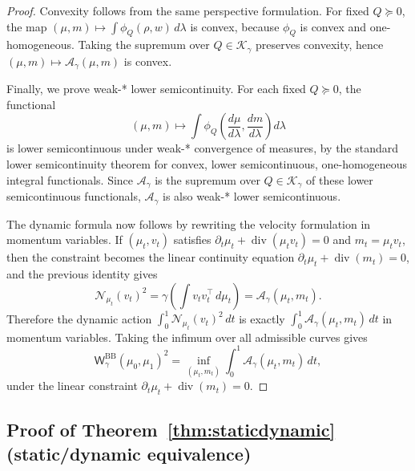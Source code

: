 \documentclass{article}
\newcommand{\MN}{\mathcal{N}}
\newcommand{\Wgbb}{\mathsf{W}_{\gamma}^{\mathrm{BB}}}
\newcommand{\divv}{\operatorname{div}}
\newcommand{\cK}{\mathcal K_\gamma}
\newcommand{\cA}{\mathcal A_\gamma}
\begin{document}
\begin{proof}
Convexity follows from the same perspective formulation. For fixed
$Q\succeq0$, the map $(\mu,m)\mapsto\int\phi_Q(\rho,w)\,d\lambda$ is convex,
because $\phi_Q$ is convex and one-homogeneous. Taking the supremum over
$Q\in\cK$ preserves convexity, hence $(\mu,m)\mapsto\cA(\mu,m)$ is convex.

Finally, we prove weak-* lower semicontinuity. For each fixed
$Q\succeq0$, the functional
\[
    (\mu,m)\longmapsto
    \int \phi_Q\!\left(\frac{d\mu}{d\lambda},
                       \frac{dm}{d\lambda}\right)d\lambda
\]
is lower semicontinuous under weak-* convergence of measures, by the standard
lower semicontinuity theorem for convex, lower semicontinuous,
one-homogeneous integral functionals. Since $\cA$ is the supremum over
$Q\in\cK$ of these lower semicontinuous functionals, $\cA$ is also weak-*
lower semicontinuous.

The dynamic formula now follows by rewriting the velocity formulation in
momentum variables. If $(\mu_t,v_t)$ satisfies
$\partial_t\mu_t+\divv(\mu_t v_t)=0$ and $m_t=\mu_t v_t$, then the constraint
becomes the linear continuity equation
$\partial_t\mu_t+\divv(m_t)=0$, and the previous identity gives
\[
    \MN_{\mu_t}(v_t)^2
    =
    \gamma\!\left(\int v_t v_t^\top\,d\mu_t\right)
    =
    \cA(\mu_t,m_t).
\]
Therefore the dynamic action
$\int_0^1\MN_{\mu_t}(v_t)^2\,dt$ is exactly
$\int_0^1\cA(\mu_t,m_t)\,dt$ in momentum variables. Taking the infimum over
all admissible curves gives
\[
    \Wgbb(\mu_0,\mu_1)^2
    =
    \inf_{(\mu_t,m_t)}
    \int_0^1 \cA(\mu_t,m_t)\,dt,
\]
under the linear constraint
$\partial_t\mu_t+\divv(m_t)=0$.
\end{proof}




\subsection{Proof of Theorem~\ref{thm:staticdynamic} (static/dynamic equivalence)}
\end{document}
